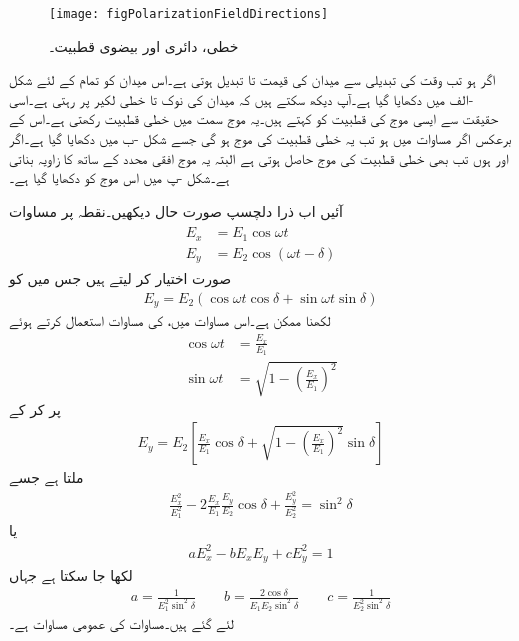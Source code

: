 \begin{figure}
\centering
\texttt{[image: figPolarizationFieldDirections]}
\caption{خطی، دائری اور بیضوی قطبیت۔}
\label{شکل_قطبیت_خطی_قطبیت}
\end{figure}
اگر  ہو تب وقت  کی تبدیلی سے میدان کی قیمت  تا  تبدیل ہوتی ہے۔اس میدان کو تمام  کے لئے شکل -الف میں دکھایا گیا ہے۔آپ دیکھ سکتے ہیں کہ میدان کی نوک  تا  خطی لکیر پر رہتی ہے۔اسی حقیقت سے ایسی موج کی قطبیت کو   کہتے ہیں۔یہ موج  سمت میں خطی قطبیت رکھتی ہے۔اس کے برعکس اگر مساوات  میں  ہو تب یہ  خطی قطبیت کی موج ہو گی جسے شکل -ب میں دکھایا گیا ہے۔اگر  اور  ہوں تب بھی خطی قطبیت کی موج حاصل ہوتی ہے البتہ یہ موج افقی محدد کے ساتھ  کا زاویہ بناتی ہے۔شکل -پ میں اس موج کو دکھایا گیا ہے۔

آئیں اب ذرا دلچسپ صورت حال دیکھیں۔نقطہ  پر مساوات 
\begin{gather}
\begin{aligned}\label{مساوات_قطبیت_ابتدائی_نقطے_پر_میدان}
E_x&=E_1 \cos \omega t\\
E_y&=E_2 \cos (\omega t  -\delta)
\end{aligned}
\end{gather}
صورت اختیار کر لیتے ہیں جس میں  کو
\begin{align*}
E_y=E_2 \left(\cos \omega t \cos \delta + \sin \omega t \sin \delta\right)
\end{align*}
لکھنا ممکن ہے۔اس مساوات میں،   کی مساوات استعمال کرتے ہوئے
\begin{align*}
\cos \omega t &=\tfrac{E_x}{E_1}\\
\sin \omega t&=\sqrt{1-\left(\tfrac{E_x}{E_1} \right)^2}
\end{align*}
پر کر کے
\begin{align*}
E_y=E_2 \left[\frac{E_x}{E_1} \cos \delta+\sqrt{1-\left(\frac{E_x}{E_1}\right)^2} \sin \delta\right]
\end{align*}
ملتا ہے جسے
\begin{align}\label{مساوات_قطبیت_عمومی_بیضوی_قطبیت_الف}
\frac{E_x^2}{E_1^2}-2 \frac{E_x}{E_1} \frac{E_y}{E_2} \cos \delta +\frac{E_y^2}{E_2^2}=\sin^2 \delta
\end{align}
یا
\begin{align}\label{مساوات_قطبیت_عمومی_بیضوی_قطبیت_ب}
a E_x^2-b E_x E_y +c E_y^2=1
\end{align}
لکھا جا سکتا ہے جہاں
\begin{align}
a=\frac{1}{E_1^2 \sin^2 \delta} \quad \quad b=\frac{2 \cos \delta}{E_1 E_2 \sin^2 \delta} \quad \quad c=\frac{1}{E_2^2 \sin^2 \delta}
\end{align}
لئے گئے ہیں۔مساوات   کی عمومی مساوات ہے۔

